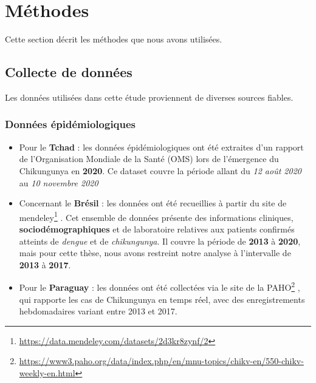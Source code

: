 
\section{Méthodes}
Cette section décrit les méthodes que nous avons utilisées.

\subsection{Collecte de données}
Les données utilisées dans cette étude proviennent de diverses sources fiables. 
\subsubsection{Données épidémiologiques}
\begin{itemize}
	\item Pour le \textbf{Tchad} : les données épidémiologiques ont été extraites d'un rapport~\cite{rapport2020oms} de l'Organisation Mondiale de la Santé (OMS) lors de l'émergence du Chikungunya en \textbf{2020}. Ce dataset couvre la période allant du \textit{12 août 2020} au \textit{10 novembre 2020}
	\item Concernant le \textbf{Brésil} : les données ont été recueillies à partir du site de mendeley\footnote{\url{https://data.mendeley.com/datasets/2d3kr8zynf/2}} . Cet ensemble de données présente des informations cliniques, \textbf{sociodémographiques} et de laboratoire relatives aux patients confirmés atteints de \textit{dengue} et de \textit{chikungunya}. Il couvre la période de \textbf{2013} à \textbf{2020}, mais pour cette thèse, nous avons restreint notre analyse à l'intervalle de \textbf{2013} à \textbf{2017}.
	\item Pour le \textbf{Paraguay} : les données ont été collectées via le site de la PAHO\footnote{\url{https://www3.paho.org/data/index.php/en/mnu-topics/chikv-en/550-chikv-weekly-en.html}} , qui rapporte les cas de Chikungunya en temps réel, avec des enregistrements hebdomadaires variant entre 2013 et 2017.
\end{itemize}
